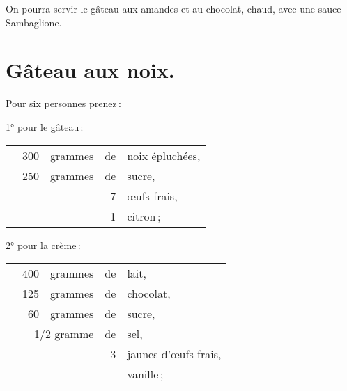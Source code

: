 \sk

On pourra servir le gâteau aux amandes et au chocolat, chaud, avec une sauce
Sambaglione.

\section*{\centering Gâteau aux noix.}
{}

Pour six personnes prenez :

\medskip

1° pour le gâteau :

\footnotesize
\begin{longtable}{rrrrp{16em}}
  &  300 & grammes & de & noix épluchées,                                                                 \\
  &  250 & grammes & de & sucre,                                                                          \\
  &      &         &  7 & œufs frais,                                                                     \\
  &      &         &  1 & citron ;                                                                        \\
\end{longtable}
\normalsize

2° pour la crème :

\footnotesize
\begin{longtable}{rrrrp{16em}}
  &  400 & grammes & de & lait,                                                                           \\
  &  125 & grammes & de & chocolat,                                                                       \\
  &   60 & grammes & de & sucre,                                                                          \\
  & \multicolumn{2}{r}{1/2 gramme} & de & sel,                                                            \\
  &      &         &  3 & jaunes d'œufs frais,                                                            \\
  &      &         &    & vanille ;                                                                       \\
\end{longtable}
\normalsize

